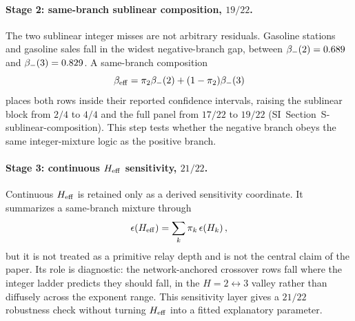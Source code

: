 \paragraph{Stage 2: same-branch sublinear composition, \(19/22\).}
The two sublinear integer misses are not arbitrary residuals. Gasoline
stations and gasoline sales fall in the widest negative-branch gap,
between \(\beta_-\!\left(2\right)=0.689\) and \(\beta_-\!\left(3\right)=0.829\). A same-branch
composition
\[
\beta_{\mathrm{eff}}
 = \pi_2\beta_-\!\left(2\right)+(1-\pi_2)\beta_-\!\left(3\right)
\]
places both rows inside their reported confidence intervals, raising the
sublinear block from \(2/4\) to \(4/4\) and the full panel from \(17/22\)
to \(19/22\) (SI~Section~\textsf{S-sublinear-composition}). This step tests
whether the negative branch obeys the same integer-mixture logic as the
positive branch.

\paragraph{Stage 3: continuous \(H_{\mathrm{eff}}\) sensitivity, \(21/22\).}
Continuous \(H_{\mathrm{eff}}\) is retained only as a derived sensitivity coordinate.
It summarizes a same-branch mixture through
\[
\epsilon\!\left(H_{\mathrm{eff}}\right)=\sum_k\pi_k\,\epsilon\!\left(H_k\right),
\]
but it is not treated as a primitive relay depth and is not the central
claim of the paper. Its role is diagnostic: the network-anchored crossover
rows fall where the integer ladder predicts they should fall, in the
\(H=2\leftrightarrow3\) valley rather than diffusely across the exponent
range. This sensitivity layer gives a \(21/22\) robustness check without
turning \(H_{\mathrm{eff}}\) into a fitted explanatory parameter.

